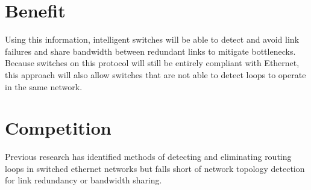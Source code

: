 \documentclass{article}
\begin{document}
\section{Benefit}
    Using this information, intelligent switches will be able to detect and avoid link failures and share bandwidth between redundant links to mitigate bottlenecks. Because switches on this protocol will still be entirely compliant with Ethernet, this approach will also allow switches that are not able to detect loops to operate in the same network.
\section{Competition}
    Previous research has identified methods of detecting and eliminating routing loops in switched ethernet networks but falls short of network topology detection for link redundancy or bandwidth sharing. 
\end{document}
